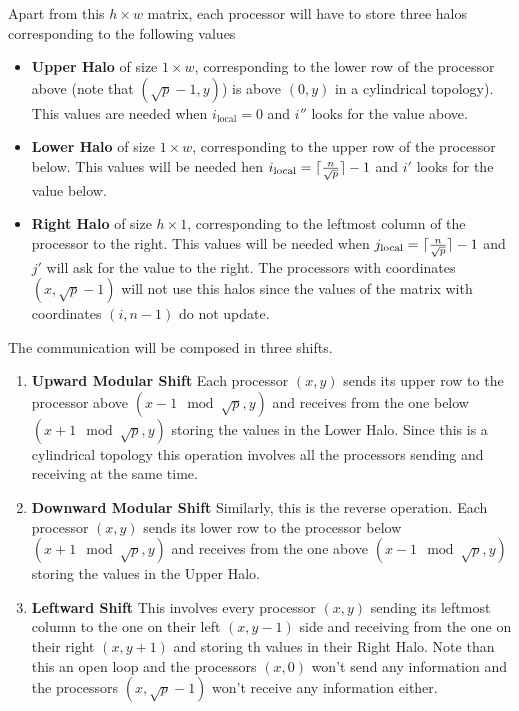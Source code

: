 \documentclass[a4paper]{article}
\begin{document}
    Apart from this $h \times w$ matrix, each processor will have to store three halos corresponding to the following values
    \begin{itemize}
        \item \textbf{Upper Halo} of size $1 \times w$, corresponding to the lower row of the processor above (note that $(\sqrt{p}-1,y)$) is above $(0,y)$ in a cylindrical topology). This values are needed when $i_{\text{local}} = 0$ and $i''$ looks for the value above.
        \item \textbf{Lower Halo} of size $1 \times w$, corresponding to the upper row of the processor below. This values will be needed hen $i_{\text{local}} = \lceil\frac{n}{\sqrt{p}}\rceil -1$ and $i'$ looks for the value below.
        \item \textbf{Right Halo} of size $h \times 1$, corresponding to the leftmost column of the processor to the right. This values will be needed when $j_{\text{local}} = \lceil\frac{n}{\sqrt{p}}\rceil -1$ and $j'$ will ask for the value to the right. The processors with coordinates $(x, \sqrt{p}-1)$ will not use this halos since the values of the matrix with coordinates $(i,n-1)$ do not update.
    \end{itemize}
    The communication will be composed in three shifts.
    \begin{enumerate}
        \item \textbf{Upward Modular Shift} Each processor $(x,y)$ sends its upper row to the processor above $(x -1 \mod \sqrt{p},y)$ and receives from the one below $(x +1 \mod \sqrt{p},y)$ storing the values in the Lower Halo. Since this is a cylindrical topology this operation involves all the processors sending and receiving at the same time.
        \item \textbf{Downward Modular Shift} Similarly, this is the reverse operation. Each processor $(x,y)$ sends its lower row to the processor below $(x +1 \mod \sqrt{p},y)$ and receives from the one above $(x -1 \mod \sqrt{p},y)$ storing the values in the Upper Halo.
        \item \textbf{Leftward Shift} This involves every processor $(x,y)$ sending its leftmost column to the one on their left $(x,y-1)$ side and receiving from the one on their right $(x,y+1)$ and storing th values in their Right Halo. Note than this an open loop and the processors $(x,0)$ won't send any information and the processors $(x,\sqrt{p}-1)$ won't receive any information either.
    \end{enumerate}
\end{document}
